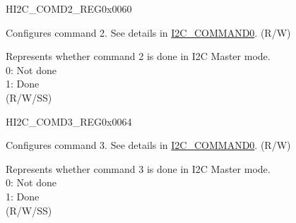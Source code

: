     \begin{register}{H}{I2C\_COMD2\_REG}{0x0060}\label{regdesc:I2CCOMD2REG}
    \regnewline%
    \begin{regdesc}\begin{reglist}
    \label{fielddesc:I2CCOMMAND2}\item [I2C\_COMMAND2] Configures command 2. See details in \hyperref[fielddesc:I2CCOMMAND0]{I2C\_COMMAND0}. (R/W)
    \label{fielddesc:I2CCOMMAND2DONE}\item [I2C\_COMMAND2\_DONE] Represents whether command 2 is done in I2C Master mode.\\
    0: Not done \\
    1: Done \\ (R/W/SS)
    \end{reglist}\end{regdesc}
    \end{register}


    \begin{register}{H}{I2C\_COMD3\_REG}{0x0064}\label{regdesc:I2CCOMD3REG}
    \regnewline%
    \begin{regdesc}\begin{reglist}
    \label{fielddesc:I2CCOMMAND3}\item [I2C\_COMMAND3] Configures command 3. See details in  \hyperref[fielddesc:I2CCOMMAND0]{I2C\_COMMAND0}. (R/W)
    \label{fielddesc:I2CCOMMAND3DONE}\item [I2C\_COMMAND3\_DONE] Represents whether command 3 is done in I2C Master mode.\\
    0: Not done \\
    1: Done \\ (R/W/SS)
    \end{reglist}\end{regdesc}
    \end{register}



